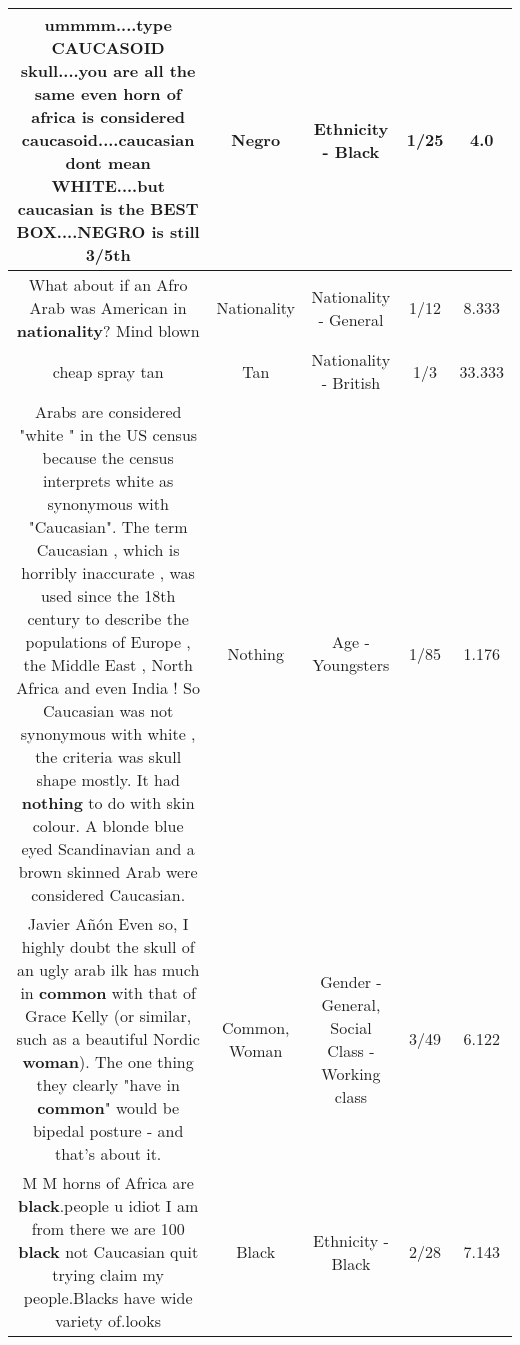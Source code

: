 \documentclass[11pt]{article}
\newlength\mylength
\begin{document}
\begin{center}
\begin{longtable}{|C{.65\mylength}|C{.30\mylength}|C{.12\mylength}|C{.12\mylength}|C{.12\mylength}|}
  \small ummmm....type CAUCASOID skull....you are all the same even horn of africa is considered caucasoid....caucasian dont mean WHITE....but caucasian is the BEST BOX....\textbf{NEGRO} is still 3/5th\normalsize   & Negro & Ethnicity - Black & 1/25 & 4.0 \\  \hline
  \small What about if an Afro Arab was American in \textbf{nationality}? Mind blown\normalsize   & Nationality & Nationality - General & 1/12 & 8.333 \\  \hline
  \small cheap spray tan\normalsize   & Tan & Nationality - British & 1/3 & 33.333 \\  \hline
  \small Arabs are considered "white " in the US census because the census interprets white as synonymous with "Caucasian". The term Caucasian , which is horribly inaccurate , was used since the 18th century to describe the populations of Europe , the Middle East , North Africa and even India ! So Caucasian was not synonymous with white , the criteria was skull shape mostly. It had \textbf{nothing} to do with skin colour. A blonde blue eyed Scandinavian and a brown skinned Arab were considered Caucasian.\normalsize   & Nothing & Age - Youngsters & 1/85 & 1.176 \\  \hline
  \small Javier Añón Even so, I highly doubt the skull of an ugly arab  ilk has much in \textbf{common} with that of Grace Kelly (or similar, such as a beautiful Nordic \textbf{woman}).  The one thing they clearly "have in \textbf{common}" would be bipedal posture - and that's about it.\normalsize   & Common, Woman & Gender - General, Social Class - Working class & 3/49 & 6.122 \\  \hline
  \small M M horns of Africa are \textbf{black}.people u idiot I am from there we are 100 \textbf{black} not Caucasian quit trying claim my people.Blacks have wide variety of.looks\normalsize   & Black & Ethnicity - Black & 2/28 & 7.143 \\  \hline

\end{longtable}
\end{center}
\end{document}
